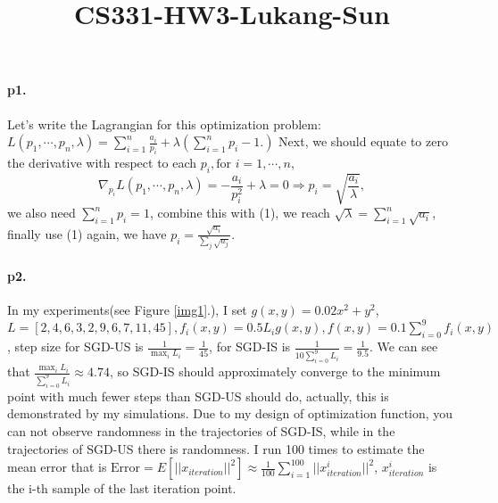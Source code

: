 \documentclass[12pt,a4paper]{article}
\title{CS331-HW3-Lukang-Sun}
\begin{document}
	\maketitle
	\paragraph{p1.}
	Let's write the Lagrangian for this optimization problem: $L(p_1,\cdots,p_n,\lambda) = \sum_{i=1}^{n} \frac{a_{i}}{p_{i}}+\lambda (\sum_{i=1}^{n}p_i-1.)$ Next, we should equate to zero the derivative with respect to each $p_i,\text{for } i=1,\cdots, n$,
	\begin{equation}
			\nabla_{p_i}L(p_1,\cdots,p_n,\lambda) = -\frac{a_i}{p_i^2}+\lambda = 0 \Rightarrow p_i = \sqrt{\frac{a_i}{\lambda}},
	\end{equation}
   we also need $\sum_{i=1} ^{n}p_i=1$, combine this with (1), we reach $\sqrt{\lambda} = \sum_{i=1}^{n}\sqrt{a_i}$, finally use (1) again, we have $p_{i}=\frac{\sqrt{a_{i}}}{\sum_{j} \sqrt{a_{j}}}.$


\paragraph{p2.}
In my experiments(see Figure \ref{img1}.), I set $g(x,y) = 0.02x^2+y^2$, $L = \left[2,4,6,3,2,9,6,7,11,45\right], f_i(x,y) = 0.5L_ig(x,y), f(x,y) = 0.1\sum_{i=0}^{9}f_i(x,y)$, step size for SGD-US is $\frac{1}{\max_iL_i} = \frac{1}{45}$, for SGD-IS is $\frac{1}{10\sum_{i=0}^{9}L_i}=\frac{1}{9.5}$. We can  see that $\frac{\max_iL_i}{\sum_{i=0}^{9}L_i}\approx 4.74$, so SGD-IS should approximately converge to the minimum point with much fewer steps than SGD-US should do, actually, this is demonstrated by my simulations. Due to my design of optimization function, you can not observe randomness in the trajectories of SGD-IS, while in the trajectories of SGD-US there is randomness. I run 100 times to estimate the mean error that is $\text{Error} = E\left[||x_{iteration}||^2\right]\approx \frac{1}{100}\sum_{i=1}^{100} ||x_{iteration}^i||^2$, $x_{iteration}^i$ is the i-th sample of the last iteration point.
\end{document}

